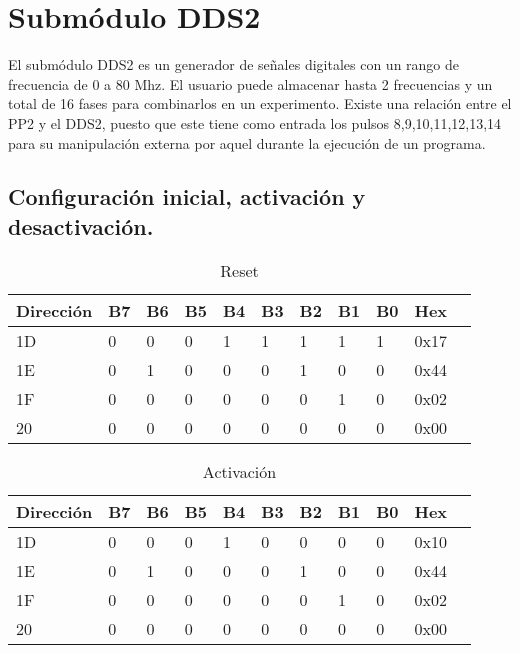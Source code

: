 \section{Subm\'odulo DDS2}

El subm\'odulo DDS2 es un generador de se\~nales digitales con un rango de frecuencia de 0 a 80 Mhz.
El usuario puede almacenar hasta 2 frecuencias y un total de 16 fases para 
combinarlos en un experimento.
Existe una relaci\'on entre el PP2 y el DDS2, puesto que este tiene como entrada
los pulsos 8,9,10,11,12,13,14 para su manipulaci\'on externa por aquel durante
la ejecuci\'on de un programa.

\subsection{Configuraci\'on inicial, activaci\'on y desactivaci\'on.}

\begin{table}[ht]
    \centering
    \begin{tabular}{|l|l|l|l|l|l|l|l|l|l|l|}
    \hline
    Direcci\'on  &B7 & B6 & B5 & B4& B3 & B2& B1 & B0 &Hex\\
    \hline
    1D  &0 & 0 & 0 & 1& 1 & 1& 1 & 1 &0x17\\
    \hline
    1E  &0 & 1 & 0 & 0& 0 & 1& 0 & 0 &0x44\\
    \hline
    1F  &0 & 0 & 0 & 0& 0 & 0& 1 & 0 & 0x02\\
    \hline
    20  &0 & 0 & 0 & 0 & 0 & 0& 0 & 0&0x00 \\
    \hline
    \end{tabular}
    \caption{\label{tab:dds2_config_inicial}Reset}
    \end{table}

    \begin{table}[ht]
    \centering
    \begin{tabular}{|l|l|l|l|l|l|l|l|l|l|l|}
    \hline
    Direcci\'on  &B7 & B6 & B5 & B4& B3 & B2& B1 & B0 &Hex\\
    \hline
    1D  &0 & 0 & 0 & 1& 0 & 0& 0 & 0 &0x10\\
    \hline
    1E  &0 & 1 & 0 & 0& 0 & 1& 0 & 0 &0x44\\
    \hline
    1F  &0 & 0 & 0 & 0& 0 & 0& 1 & 0 & 0x02\\
    \hline
    20  &0 & 0 & 0 & 0 & 0 & 0& 0 & 0&0x00 \\
    \hline
    \end{tabular}
    \caption{\label{tab:dds2_activate}Activaci\'on}
    \end{table}
    
